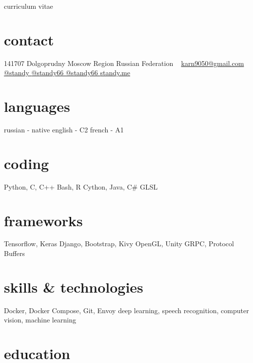 \documentclass[]{friggeri-cv}
\def\faTelegram{{\FA \symbol{"F2C6}}}
\begin{document}
       {curriculum vitae}

\begin{aside}
  \section{contact}
    141707 Dolgoprudny
    Moscow Region
    Russian Federation
    ~
    \href{mailto:karn9050@gmail.com}{karn9050@gmail.com \faEnvelope}
    \href{https://t.me/standy}{@standy \faTelegram}
    \href{https://github.com/standy66}{@standy66 \faGithub}
    \href{https://www.linkedin.com/in/standy66/}{@standy66 \faLinkedinSquare}
    \href{http://standy.me}{standy.me \faGlobe}
  \section{languages}
    russian - native
    english - C2
    french - A1
  \section{coding}
    Python, C, C++
    Bash, R
    Cython, Java, C\#
    GLSL
  \section{frameworks}
    Tensorflow, Keras
    Django, Bootstrap, Kivy
    OpenGL, Unity
    GRPC, Protocol Buffers
  \section{skills \& technologies}
  	Docker, Docker Compose, Git, Envoy
    deep learning, speech recognition, computer vision, machine learning
\end{aside}

\section{education}
\end{document}
